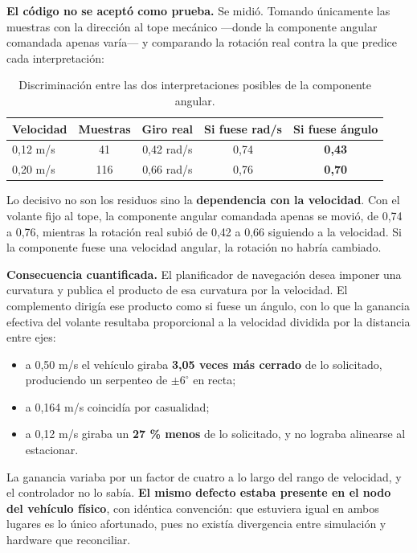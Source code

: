 \documentclass[12pt,letterpaper]{article}
\begin{document}
\textbf{El código no se aceptó como prueba.} Se midió. Tomando únicamente las muestras con la dirección al tope mecánico ---donde la componente angular comandada apenas varía--- y comparando la rotación real contra la que predice cada interpretación:

\begin{table}[H]
    \centering
    \small
    \caption{Discriminación entre las dos interpretaciones posibles de la componente angular.}
    \label{tab:discriminacion}
    \begin{tabular}{@{}lcccc@{}}
        \toprule
        \textbf{Velocidad} & \textbf{Muestras} & \textbf{Giro real} & \textbf{Si fuese rad/s} & \textbf{Si fuese ángulo} \\ \midrule
        0,12 m/s & 41  & 0,42 rad/s & 0,74 & \textbf{0,43} \\
        0,20 m/s & 116 & 0,66 rad/s & 0,76 & \textbf{0,70} \\ \bottomrule
    \end{tabular}
\end{table}

Lo decisivo no son los residuos sino la \textbf{dependencia con la velocidad}. Con el volante fijo al tope, la componente angular comandada apenas se movió, de 0,74 a 0,76, mientras la rotación real subió de 0,42 a 0,66 siguiendo a la velocidad. Si la componente fuese una velocidad angular, la rotación no habría cambiado.

\textbf{Consecuencia cuantificada.} El planificador de navegación desea imponer una curvatura y publica el producto de esa curvatura por la velocidad. El complemento dirigía ese producto como si fuese un ángulo, con lo que la ganancia efectiva del volante resultaba proporcional a la velocidad dividida por la distancia entre ejes:

\begin{itemize}
    \item a 0,50 m/s el vehículo giraba \textbf{3,05 veces más cerrado} de lo solicitado, produciendo un serpenteo de $\pm 6^\circ$ en recta;
    \item a 0,164 m/s coincidía por casualidad;
    \item a 0,12 m/s giraba un \textbf{27 \% menos} de lo solicitado, y no lograba alinearse al estacionar.
\end{itemize}

La ganancia variaba por un factor de cuatro a lo largo del rango de velocidad, y el controlador no lo sabía. \textbf{El mismo defecto estaba presente en el nodo del vehículo físico}, con idéntica convención: que estuviera igual en ambos lugares es lo único afortunado, pues no existía divergencia entre simulación y hardware que reconciliar.
\end{document}
